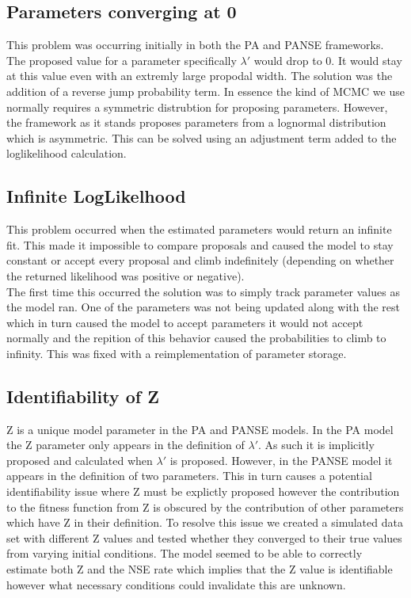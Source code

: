 \documentclass{article}
\begin{document}
\subsection{Parameters converging at 0}
This problem was occurring initially in both the PA and PANSE frameworks. The proposed value for a parameter specifically $\lambda'$ would drop to 0. It would stay at this value even with an extremly large propodal width.
The solution was the addition of a reverse jump probability term. In essence the kind of MCMC we use normally requires a symmetric distrubtion for proposing parameters. However, the framework as it stands proposes parameters from a lognormal distribution which is asymmetric. This can be solved using an adjustment term added to the loglikelihood calculation.

\subsection{Infinite LogLikelhood}
This problem occurred when the estimated parameters would return an infinite fit. This made it impossible to compare proposals and caused the model to stay constant or accept every proposal and climb indefinitely (depending on whether the returned likelihood was positive or negative).\\
The first time this occurred the solution was to simply track parameter values as the model ran. One of the parameters was not being updated along with the rest which in turn caused the model to accept parameters it would not accept normally and the repition of this behavior caused the probabilities to climb to infinity. This was fixed with a reimplementation of parameter storage. 

\subsection{Identifiability of Z} 
Z is a unique model parameter in the PA and PANSE models. In the PA model the Z parameter only appears in the definition of $\lambda'$. As such it is implicitly proposed and calculated when $\lambda'$ is proposed. However, in the PANSE model it appears in the definition of two parameters. This in turn causes a potential identifiability issue where Z must be explictly proposed however the contribution to the fitness function from Z is obscured by the contribution of other parameters which have Z in their definition. To resolve this issue we created a simulated data set with different Z values and tested whether they converged to their true values from varying initial conditions. The model seemed to be able to correctly estimate both Z and the NSE rate which implies that the Z value is identifiable however what necessary conditions could invalidate this are unknown.
\end{document}

